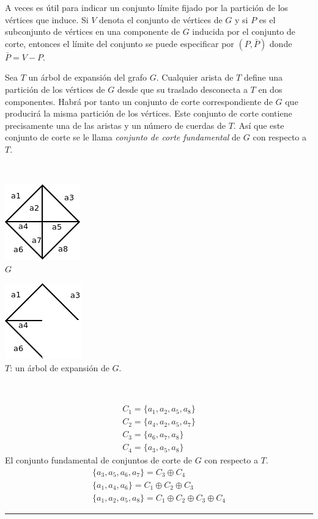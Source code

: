 \documentclass[10pt,a5paper]{book}
\begin{document}
A veces es útil para indicar un conjunto límite fijado por la partición de los vértices que induce. Si $V$ denota el conjunto de vértices de $G$ y si $P$ es el subconjunto de vértices en una componente de $G$ inducida por el conjunto de corte, entonces el límite del conjunto se puede especificar por $(P,\bar{P})$ donde $\bar{P} = V - P$.

Sea $T$ un árbol de expansión del grafo $G$. Cualquier arista de $T$ define una partición de los vértices de $G$ desde que su traslado desconecta a $T$ en dos componentes. Habrá por tanto un conjunto de corte correspondiente de $G$ que producirá la misma partición de los vértices. Este conjunto de corte contiene precisamente una de las aristas y un número de cuerdas de $T$. Así que este conjunto de corte se le llama \emph{conjunto de corte fundamental} de $G$ con respecto a $T$.

\begin{figure}[H]
\caption{ }
\end{figure}
\hrulefill{}\\
\parbox{6cm}
{
  \includegraphics[scale=.6]{Fig2_10_1.png}\\
  $G$
}
\parbox{8cm}
{
  \includegraphics[scale=.61]{Fig2_10_2.png}\\
  \hspace*{-.2in}$T$: un árbol de expansión de $G$.
}\hfill\\
\parbox{10cm}
{
  \begin{align}
    C_1 = \{a_1, a_2, a_5, a_8\} \nonumber\\
    C_2 = \{a_4, a_2, a_5, a_7\}\nonumber \\
    C_3 = \{a_6, a_7, a_8\} \nonumber\\
    C_4 = \{a_3, a_5, a_8\} \nonumber
  \end{align}
  El conjunto fundamental de conjuntos de corte de $G$ con respecto a $T$.\\
  \begin{align}
    \{a_3 , a_5, a_6, a_7\} = C_3 \oplus C_4 \nonumber\\
    \{a_1, a_4, a_6\} = C_1 \oplus C_2 \oplus C_3 \nonumber\\
    \{a_1, a_2, a_5, a_8\} = C_1 \oplus C_2 \oplus C_3 \oplus C_4 \nonumber
  \end{align}
}\hrule
\hfill
\end{document}
